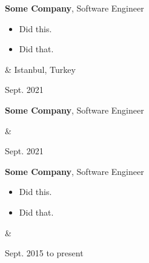 \documentclass[10pt, letterpaper]{article}
\newenvironment{highlights}{
        \begin{itemize}[
                topsep=0pt,
                parsep=0.10 cm,
                partopsep=0pt,
                itemsep=0pt,
                after=\vspace{-1\baselineskip},
                leftmargin=0.4 cm + 3pt
            ]
    }{
        \end{itemize}
    } %
\let\originalTabularx\tabularx
\let\originalEndTabularx\endtabularx
\renewenvironment{tabularx}{\bgroup\centering\originalTabularx}{\originalEndTabularx\par\egroup}
\begin{document}
        \vspace{0.2 cm}
        \begin{tabularx}{
            \textwidth-0.4 cm-0.13cm
        }{
            K{0.2 cm}
            R{4.1 cm}
        }
            \textbf{Some Company}, Software Engineer

            \vspace{0.10 cm}

            \begin{highlights}
                \item Did this.
                \item Did that.
            \end{highlights}
            &
            Istanbul, Turkey

            Sept. 2021
        \end{tabularx}

        \vspace{0.2 cm}
        \begin{tabularx}{
            \textwidth-0.4 cm-0.13cm
        }{
            K{0.2 cm}
            R{4.1 cm}
        }
            \textbf{Some Company}, Software Engineer

            \vspace{0.10 cm}

            &
            

            Sept. 2021
        \end{tabularx}

        \vspace{0.2 cm}
        \begin{tabularx}{
            \textwidth-0.4 cm-0.13cm
        }{
            K{0.2 cm}
            R{4.1 cm}
        }
            \textbf{Some Company}, Software Engineer

            \vspace{0.10 cm}

            \begin{highlights}
                \item Did this.
                \item Did that.
            \end{highlights}
            &
            

            Sept. 2015 to present
        \end{tabularx}
\end{document}
